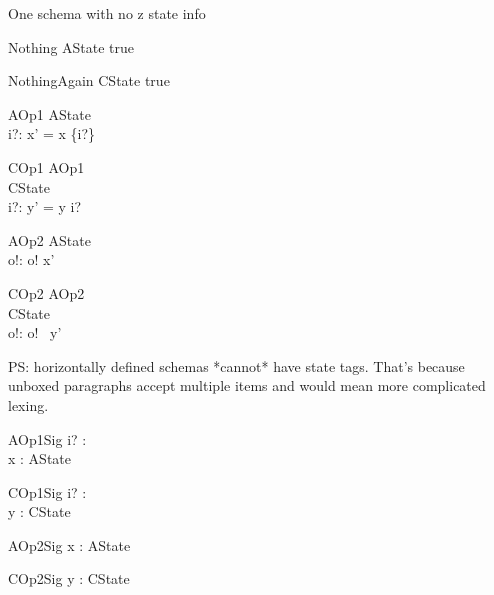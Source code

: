 One schema with no z state info
\begin{schema}{Nothing}
   \Delta AState
\where
   true
\end{schema}

\begin{schema}{NothingAgain}
   \Delta CState
\where
   true
\end{schema}

\begin{schema}{AOp1}
   \Delta AState \\
   i?: \nat
\where
   x' = x \cup \{i?\}
\end{schema}

\begin{schema}{COp1}
  \zfsrefines AOp1 \\
   \Delta CState \\
   i?: \nat
\where
   y' = y \cat \langle i? \rangle
\end{schema}

\begin{schema}{AOp2}
   \Xi AState \\
   o!: \nat
\where
    o! \in  x' 
\end{schema}

\begin{schema}{COp2}
  \zbsrefines AOp2 \\
   \Xi CState \\
   o!: \nat
\where
   o! \in \ran~y'
\end{schema}

PS: horizontally defined schemas *cannot* have state tags. That's because
unboxed paragraphs accept multiple items and would mean more complicated lexing.

\begin{schema}{AOp1Sig}
 i? : \nat \\
 x : \power \nat 
\where
 AState
\end{schema}

\begin{schema}{COp1Sig}
 i? : \nat \\
 y : \seq \nat 
\where
 CState
\end{schema}

\begin{schema}{AOp2Sig}
 x : \power \nat 
\where
 AState
\end{schema}

\begin{schema}{COp2Sig}
 y : \seq \nat 
\where
 CState
\end{schema}

